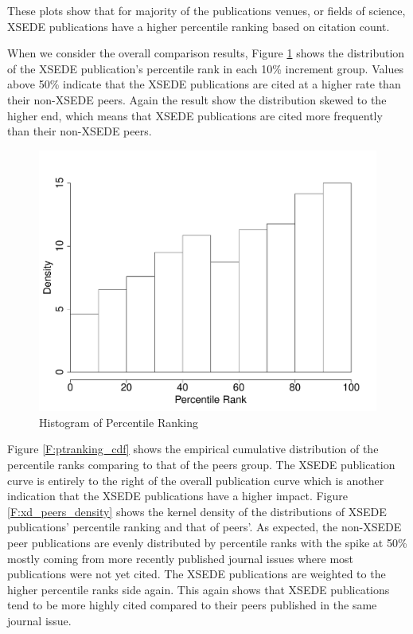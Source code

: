 \documentclass{sig-alternate}
\begin{document}
These plots show that for majority of the publications venues, or fields of
science, XSEDE publications have a higher percentile ranking based on
citation count.

When we consider the overall comparison results, Figure
\ref{F:ptranking_hist} shows the distribution of the XSEDE
publication's percentile rank in each 10\% increment group. Values
above 50\% indicate that the XSEDE publications are cited at a higher
rate than their non-XSEDE peers.  Again the result show the
distribution skewed to the higher end, which means that XSEDE
publications are cited more frequently than their non-XSEDE peers.

\begin{figure}[htb!]
    \includegraphics[width=0.80\columnwidth]{images/ptranking_histogram.pdf}
    \caption{Histogram of Percentile Ranking}
    \label{F:ptranking_hist}
\end{figure}

Figure \ref{F:ptranking_cdf} shows the empirical cumulative
distribution of the percentile ranks comparing to that of the peers
group. The XSEDE publication curve is entirely to the right of the
overall publication curve which is another indication that the XSEDE
publications have a higher impact.  Figure \ref{F:xd_peers_density}
shows the kernel density of the distributions of XSEDE publications'
percentile ranking and that of peers'. As expected, the non-XSEDE peer
publications are evenly distributed by percentile ranks with the spike
at 50\% mostly coming from more recently published journal issues
where most publications were not yet cited. The XSEDE publications are
weighted to the higher percentile ranks side again. This again shows
that XSEDE publications tend to be more highly cited compared to their
peers published in the same journal issue.
\end{document}
